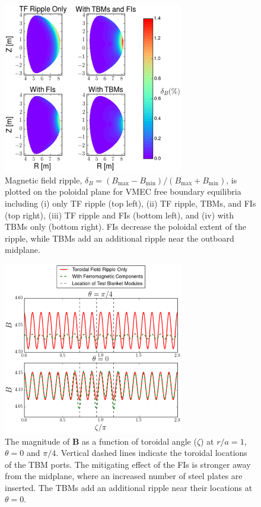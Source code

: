 \documentclass[aip, pop, preprint]{revtex4-1}
\begin{document}
\begin{figure}[h!]
\centering
\includegraphics[width=0.7\textwidth]{figure2.eps}
\caption{\label{fig:ripplecontour} Magnetic field ripple, $\delta_B = (B_{\mathrm{max}}-B_{\mathrm{min}})/(B_{\mathrm{max}} + B_{\mathrm{min}})$, is plotted on the poloidal plane for VMEC free boundary equilibria including (i) only TF ripple (top left), (ii) TF ripple, TBMs, and FIs (top right), (iii) TF ripple and FIs (bottom left), and (iv) with TBMs only (bottom right). FIs decrease the poloidal extent of the ripple, while TBMs add an additional ripple near the outboard midplane.}
\end{figure}

\begin{figure}[h!]
\centering
\includegraphics[width=0.7\textwidth]{figure3.eps}
\caption{\label{fig:toroidalripple} The magnitude of $\bm{B}$ as a function of toroidal angle ($\zeta$) at $r/a = 1$, $\theta = 0$ and $\pi/4$. Vertical dashed lines indicate the toroidal locations of the TBM ports. The mitigating effect of the FIs is stronger away from the midplane, where an increased number of steel plates are inserted. The TBMs add an additional ripple near their locations at $\theta = 0$. }
\end{figure}
\end{document}
